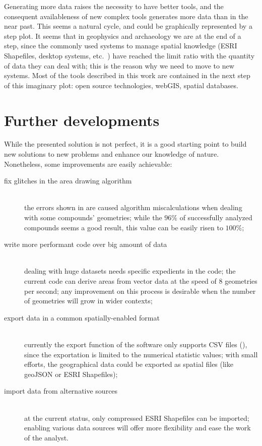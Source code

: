         Generating more data raises the necessity to have better tools, and the consequent availableness of new complex tools generates more data than in the near past. This seems a natural cycle, and could be graphically represented by a step plot. It seems that in geophysics and archaeology we are at the end of a step, since the commonly used systems to manage spatial knowledge (ESRI Shapefiles, desktop systems, etc.\ ) have reached the limit ratio with the quantity of data they can deal with; this is the reason why we need to move to new systems. Most of the tools described in this work are contained in the next step of this imaginary plot: open source technologies, webGIS, spatial databases.

    \section{Further developments}
        While the presented solution is not perfect, it is a good starting point to build new solutions to new problems and enhance our knowledge of nature. Nonetheless, some improvements are easily achievable:

        \begin{description}
            \item[fix glitches in the area drawing algorithm]\hfill\\the errors shown in  are caused algorithm miscalculations when dealing with some compounds' geometries; while the $96\%$ of successfully analyzed compounds seems a good result, this value can be easily risen to $100\%$;
            \item[write more performant code over big amount of data]\hfill\\dealing with huge datasets needs specific expedients in the code; the current code can derive areas from vector data at the speed of 8 geometries per second; any improvement on this process is desirable when the number of geometries will grow in wider contexts;
            \item[export data in a common spatially-enabled format]\hfill\\currently the export function of the software only supports CSV files (), since the exportation is limited to the numerical statistic values; with small efforts, the geographical data could be exported as spatial files (like geoJSON or ESRI Shapefiles);
            \item[import data from alternative sources]\hfill\\at the current status, only compressed ESRI Shapefiles can be imported; enabling various data sources will offer more flexibility and ease the work of the analyst.
        \end{description}
